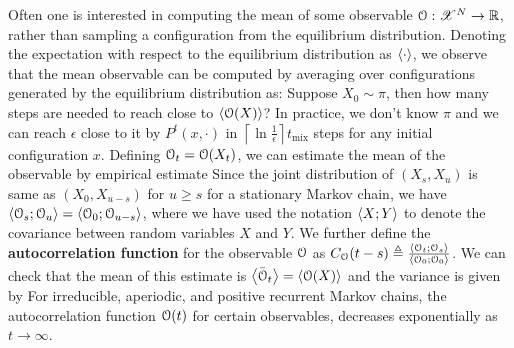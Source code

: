 \documentclass[letterpaper,english,10pt]{article}
\begin{document}
Often one is interested in computing the mean of some observable $\mathcal{O}: \mathscr{X}^N \to \mathbb{R}$, 
rather than sampling a configuration from the equilibrium distribution. 
Denoting the expectation with respect to the equilibrium distribution as $\left\langle\cdot\right\rangle$, 
we observe that the mean observable can be computed by averaging over configurations generated by the equilibrium distribution as:
Suppose $X_0 \sim \pi$, then how many steps are needed to reach close to $\left\langle\mathcal{O}(X)\right\rangle$? In practice, we don't know $\pi$ and we can reach $\epsilon$ close to it by $P^t(x,\cdot)$ in $\left\lceil\ln \frac{1}{\epsilon}\right\rceil t_{\text{mix}}$ steps for any initial configuration $x$.  
Defining $\mathcal{O}_t = \mathcal{O}(X_t)$, we can estimate the mean of the observable by empirical estimate 
Since the joint distribution of $(X_s, X_u)$ is same as $(X_0, X_{u-s})$ for $u \ge s$ for a stationary Markov chain, 
we have $\left\langle\mathcal{O}_s; \mathcal{O}_u\right\rangle = \left\langle\mathcal{O}_0; \mathcal{O}_{u-s}\right\rangle$, where we have used the notation $\left\langle X;Y\right\rangle$ to denote the covariance between random variables $X$ and $Y$. 
We further define the \textbf{autocorrelation function} for the observable $\mathcal{O}$ as $C_{\mathcal{O}}(t-s) \triangleq \frac{\left\langle\mathcal{O}_t; \mathcal{O}_s\right\rangle}{\left\langle\mathcal{O}_0; \mathcal{O}_0\right\rangle}$. 
We can check that the mean of this estimate is $\left\langle\bar{\mathcal{O}}_t\right\rangle = \left\langle\mathcal{O}(X)\right\rangle$ and the variance is given by 
For irreducible, aperiodic, and positive recurrent Markov chains, the autocorrelation function $\mathcal{O}(t)$ for certain observables, decreases exponentially as $t \to \infty$. 
\end{document}
